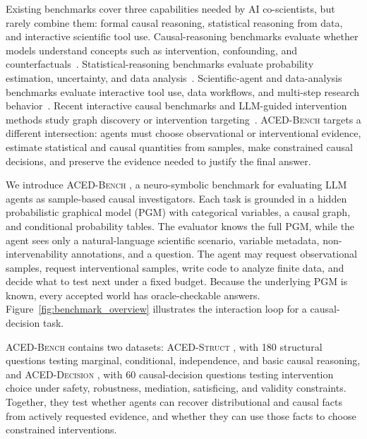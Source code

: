 \documentclass{article}
\newcommand{\bench}{\textsc{ACED-Bench} }
\newcommand{\pgmstruct}{\textsc{ACED-Struct} }
\newcommand{\pgmdecision}{\textsc{ACED-Decision} }
\begin{document}
Existing benchmarks cover three capabilities needed by AI co-scientists, but rarely combine them: formal causal reasoning, statistical reasoning from data, and interactive scientific tool use.
Causal-reasoning benchmarks evaluate whether models understand concepts such as intervention, confounding, and counterfactuals~\citep{jinCLadderAssessingCausal2023,wangCausalBenchComprehensiveBenchmark2024,jinCanLargeLanguage2024}.
Statistical-reasoning benchmarks evaluate probability estimation, uncertainty, and data analysis~\citep{liuAreLLMsCapable2024,paruchuriWhatAreOdds2024,nafarReasoningUncertainText2025,zhuAreLargeLanguage2024}.
Scientific-agent and data-analysis benchmarks evaluate interactive tool use, data workflows, and multi-step research behavior~\citep{wangScienceWorldYourAgent2022a,jansenDiscoveryWorldVirtualEnvironment2024,majumderDiscoveryBenchDataDrivenDiscovery2024,guBLADEBenchmarkingLanguage2024,hu2024infiagentdabench,hu2024infiagentdabench,laiKramaBenchBenchmarkAI2026}.
Recent interactive causal benchmarks and LLM-guided intervention methods study graph discovery or intervention targeting~\citep{chenAutoBenchAutomatedBenchmark2025,liCanLargeLanguage2025}.
\bench targets a different intersection: agents must choose observational or interventional evidence, estimate statistical and causal quantities from samples, make constrained causal decisions, and preserve the evidence needed to justify the final answer.

We introduce \bench, a neuro-symbolic benchmark for evaluating LLM agents as sample-based causal investigators.
Each task is grounded in a hidden probabilistic graphical model (PGM) with categorical variables, a causal graph, and conditional probability tables.
The evaluator knows the full PGM, while the agent sees only a natural-language scientific scenario, variable metadata, non-intervenability annotations, and a question.
The agent may request observational samples, request interventional samples, write code to analyze finite data, and decide what to test next under a fixed budget.
Because the underlying PGM is known, every accepted world has oracle-checkable answers.
Figure~\ref{fig:benchmark_overview} illustrates the interaction loop for a causal-decision task.

\bench contains two datasets: \pgmstruct, with 180 structural questions testing marginal, conditional, independence, and basic causal reasoning, and \pgmdecision, with 60 causal-decision questions testing intervention choice under safety, robustness, mediation, satisficing, and validity constraints.
Together, they test whether agents can recover distributional and causal facts from actively requested evidence, and whether they can use those facts to choose constrained interventions.
\end{document}
